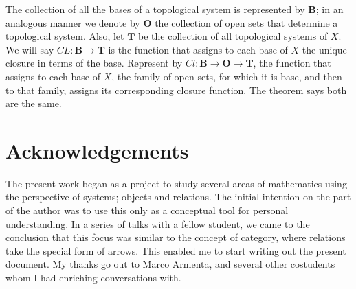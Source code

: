 \documentclass [12pt]{book}
\begin{document}
The collection of all the bases of a topological system is represented by $\textbf{B}$; in an analogous manner we denote by \textbf{O} the collection of open sets that determine a topological system. Also, let $\textbf{T}$ be the collection of all topological systems of $X$. We will say $CL:\textbf{B}\rightarrow\textbf{T}$ is the function that assigns to each base of $X$ the unique closure in terms of the base. Represent by $Cl:\textbf{B}\rightarrow\textbf{O}\rightarrow\textbf{T}$, the function that assigns to each base of $X$, the family of open sets, for which it is base, and then to that family, assigns its corresponding closure function. The theorem says both are the same.







\newpage\section*{Acknowledgements}

The present work began as a project to study several areas of mathematics using the perspective of systems; objects and relations. The initial intention on the part of the author was to use this only as a conceptual tool for personal understanding. In a series of talks with a fellow student, we came to the conclusion that this focus was similar to the concept of category, where relations take the special form of arrows. This enabled me to start writing out the present document. My thanks go out to Marco Armenta, and several other costudents whom I had enriching conversations with.
\end{document}
